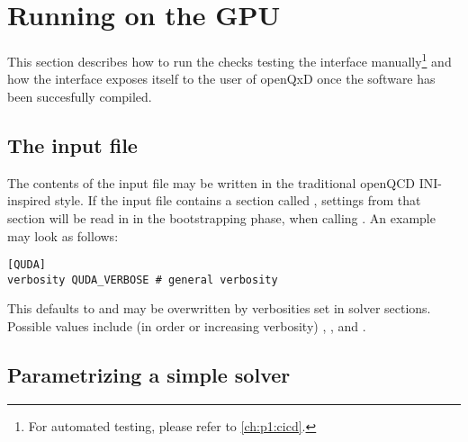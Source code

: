 \chapter{Running on the GPU}
\label{ch:p1:running}


This section describes how to run the checks testing the interface manually\footnote{For automated testing, please refer to \cref{ch:p1:cicd}.} and how the interface exposes itself to the user of openQxD once the software has been succesfully compiled.

\section{The input file}
\label{sec:running:infile}

The contents of the input file may be written in the traditional openQCD INI-inspired style.
If the input file contains a section called , settings from that section will be read in in the bootstrapping phase, \ie when calling .
An example may look as follows:
\begin{verbatim}
[QUDA]
verbosity QUDA_VERBOSE # general verbosity
\end{verbatim}
This defaults to  and may be overwritten by verbosities set in solver sections.
Possible values include (in order or increasing verbosity) , ,  and .

\section{Parametrizing a simple solver}
\label{sec:running:solver}

